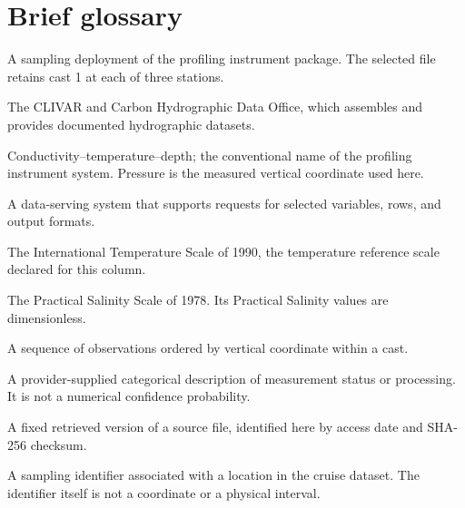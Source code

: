 \documentclass[11pt,letterpaper]{article}
\begin{document}
\section{Brief glossary}
\begin{description}[style=nextline]
  \item[Cast] A sampling deployment of the profiling instrument package. The selected file retains cast 1 at each of three stations.
  \item[CCHDO] The CLIVAR and Carbon Hydrographic Data Office, which assembles and provides documented hydrographic datasets.
  \item[CTD] Conductivity--temperature--depth; the conventional name of the profiling instrument system. Pressure is the measured vertical coordinate used here.
  \item[ERDDAP] A data-serving system that supports requests for selected variables, rows, and output formats.
  \item[ITS-90] The International Temperature Scale of 1990, the temperature reference scale declared for this column.
  \item[PSS-78] The Practical Salinity Scale of 1978. Its Practical Salinity values are dimensionless.
  \item[Profile] A sequence of observations ordered by vertical coordinate within a cast.
  \item[Quality flag] A provider-supplied categorical description of measurement status or processing. It is not a numerical confidence probability.
  \item[Snapshot] A fixed retrieved version of a source file, identified here by access date and SHA-256 checksum.
  \item[Station] A sampling identifier associated with a location in the cruise dataset. The identifier itself is not a coordinate or a physical interval.
\end{description}
\end{document}
